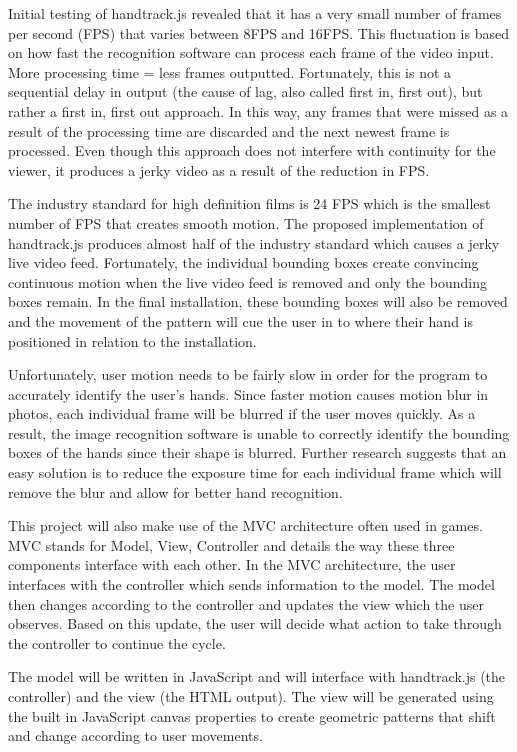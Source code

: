 \documentclass[10pt,twocolumn]{article}
\begin{document}
Initial testing of handtrack.js revealed that it has a very small number of frames per second (FPS) that varies between 8FPS and 16FPS.  This fluctuation is based on how fast the recognition software can process each frame of the video input. More processing time = less frames outputted.  Fortunately, this is not a sequential delay in output (the cause of lag, also called first in, first out), but rather a first in, first out approach.  In this way, any frames that were missed as a result of the processing time are discarded and the next newest frame is processed.  Even though this approach does not interfere with continuity for the viewer, it produces a jerky video as a result of the reduction in FPS.  

The industry standard for high definition films is 24 FPS \cite{} which is the smallest number of FPS that creates smooth motion.  The proposed implementation of handtrack.js produces almost half of the industry standard which causes a jerky live video feed.  Fortunately, the individual bounding boxes create convincing continuous motion when the live video feed is removed and only the bounding boxes remain. In the final installation, these bounding boxes will also be removed and the movement of the pattern will cue the user in to where their hand is positioned in relation to the installation.  

Unfortunately, user motion needs to be fairly slow in order for the program to accurately identify the user's hands.  Since faster motion causes motion blur in photos, each individual frame will be blurred if the user moves quickly. As a result, the image recognition software is unable to correctly identify the bounding boxes of the hands since their shape is blurred. Further research suggests that an easy solution is to reduce the exposure time for each individual frame which will remove the blur \cite{} and allow for better hand recognition.   

This project will also make use of the MVC architecture often used in games.  MVC stands for Model, View, Controller and details the way these three components interface with each other. In the MVC architecture, the user interfaces with the controller which sends information to the model.  The model then changes according to the controller and updates the view which the user observes.  Based on this update, the user will decide what action to take through the controller to continue the cycle. 

The model will be written in JavaScript and will interface with handtrack.js (the controller) and the view (the HTML output).  The view will be generated using the built in JavaScript canvas properties to create geometric patterns that shift and change according to user movements. 
\end{document}
